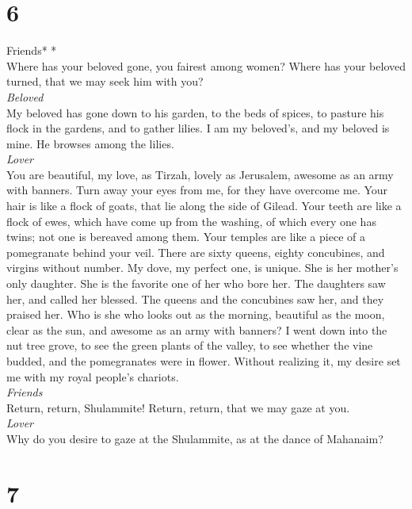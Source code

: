 \hypertarget{section-5}{%
\section{6}\label{section-5}}

\emph{\hfill\break
}Friends* *\\

 Where has your beloved gone, you fairest among women?
Where has your beloved turned, that we may seek him with you?\\
\emph{Beloved}\\
 My beloved has gone down to his garden, to the beds of
spices, to pasture his flock in the gardens, and to gather lilies.
 I am my beloved's, and my beloved is mine. He browses
among the lilies.\\
\emph{Lover}\\
 You are beautiful, my love, as Tirzah, lovely as
Jerusalem, awesome as an army with banners.  Turn away
your eyes from me, for they have overcome me. Your hair is like a flock
of goats, that lie along the side of Gilead.  Your teeth
are like a flock of ewes, which have come up from the washing, of which
every one has twins; not one is bereaved among them.  Your
temples are like a piece of a pomegranate behind your veil.
 There are sixty queens, eighty concubines, and virgins
without number.  My dove, my perfect one, is unique. She
is her mother's only daughter. She is the favorite one of her who bore
her. The daughters saw her, and called her blessed. The queens and the
concubines saw her, and they praised her.  Who is she who
looks out as the morning, beautiful as the moon, clear as the sun, and
awesome as an army with banners?  I went down into the
nut tree grove, to see the green plants of the valley, to see whether
the vine budded, and the pomegranates were in flower. 
Without realizing it, my desire set me with my royal people's
chariots.\\
\emph{Friends}\\
 Return, return, Shulammite! Return, return, that we may
gaze at you.\\
\emph{Lover}\\
Why do you desire to gaze at the Shulammite, as at the dance of
Mahanaim?

\hypertarget{section-6}{%
\section{7}\label{section-6}}

